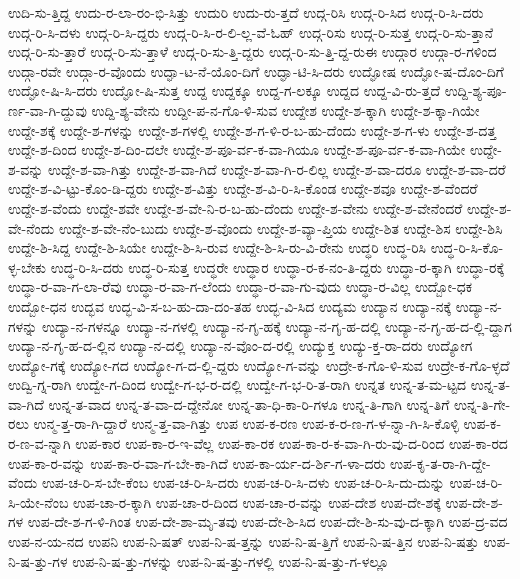 {ಉದಿ-ಸು-ತ್ತಿದ್ದ
ಉದು-ರ-ಲಾ-ರಂ-ಭಿ-ಸಿತ್ತು
ಉದುರಿ
ಉದು-ರು-ತ್ತದೆ
ಉದ್ಗ-ರಿಸಿ
ಉದ್ಗ-ರಿ-ಸಿದ
ಉದ್ಗ-ರಿ-ಸಿ-ದರು
ಉದ್ಗ-ರಿ-ಸಿ-ದಳು
ಉದ್ಗ-ರಿ-ಸಿ-ದ್ದರು
ಉದ್ಗ-ರಿ-ಸಿ-ರ-ಲಿ-ಲ್ಲ-ವೆ-ಓಹ್
ಉದ್ಗ-ರಿಸು
ಉದ್ಗ-ರಿ-ಸುತ್ತ
ಉದ್ಗ-ರಿ-ಸು-ತ್ತಾನೆ
ಉದ್ಗ-ರಿ-ಸು-ತ್ತಾರೆ
ಉದ್ಗ-ರಿ-ಸು-ತ್ತಾಳೆ
ಉದ್ಗ-ರಿ-ಸು-ತ್ತಿ-ದ್ದರು
ಉದ್ಗ-ರಿ-ಸು-ತ್ತಿ-ದ್ದ-ರುಈ
ಉದ್ಗಾರ
ಉದ್ಗಾ-ರ-ಗಳಿಂದ
ಉದ್ಗಾ-ರವೇ
ಉದ್ಗಾ-ರ-ವೊಂದು
ಉದ್ಘಾ-ಟ-ನೆ-ಯೊಂ-ದಿಗೆ
ಉದ್ಘಾ-ಟಿ-ಸಿ-ದರು
ಉದ್ಘೋಷ
ಉದ್ಘೋ-ಷ-ದೊಂ-ದಿಗೆ
ಉದ್ಘೋ-ಷಿ-ಸಿ-ದರು
ಉದ್ಘೋ-ಷಿ-ಸುತ್ತ
ಉದ್ದ
ಉದ್ದಕ್ಕೂ
ಉದ್ದ-ಗ-ಲಕ್ಕೂ
ಉದ್ದದ
ಉದ್ದ-ವಿ-ರು-ತ್ತದೆ
ಉದ್ದಿ-ಶ್ಯ-ಪೂ-ರ್ಣ-ವಾ-ಗಿ-ದ್ದುವು
ಉದ್ದಿ-ಶ್ಯ-ವೇನು
ಉದ್ದೀ-ಪ-ನ-ಗೊ-ಳಿ-ಸುವ
ಉದ್ದೇಶ
ಉದ್ದೇ-ಶ-ಕ್ಕಾಗಿ
ಉದ್ದೇ-ಶ-ಕ್ಕಾ-ಗಿಯೇ
ಉದ್ದೇ-ಶಕ್ಕೆ
ಉದ್ದೇ-ಶ-ಗಳನ್ನು
ಉದ್ದೇ-ಶ-ಗಳಲ್ಲಿ
ಉದ್ದೇ-ಶ-ಗ-ಳಿ-ರ-ಬ-ಹು-ದೆಂದು
ಉದ್ದೇ-ಶ-ಗ-ಳು
ಉದ್ದೇ-ಶ-ದತ್ತ
ಉದ್ದೇ-ಶ-ದಿಂದ
ಉದ್ದೇ-ಶ-ದಿಂ-ದಲೇ
ಉದ್ದೇ-ಶ-ಪೂ-ರ್ವ-ಕ-ವಾ-ಗಿಯೂ
ಉದ್ದೇ-ಶ-ಪೂ-ರ್ವ-ಕ-ವಾ-ಗಿಯೇ
ಉದ್ದೇ-ಶ-ವನ್ನು
ಉದ್ದೇ-ಶ-ವಾ-ಗಿತ್ತು
ಉದ್ದೇ-ಶ-ವಾ-ಗಿದೆ
ಉದ್ದೇ-ಶ-ವಾ-ಗಿ-ರ-ಲಿಲ್ಲ
ಉದ್ದೇ-ಶ-ವಾ-ದರೂ
ಉದ್ದೇ-ಶ-ವಾ-ದರೆ
ಉದ್ದೇ-ಶ-ವಿ-ಟ್ಟು-ಕೊಂ-ಡಿ-ದ್ದರು
ಉದ್ದೇ-ಶ-ವಿತ್ತು
ಉದ್ದೇ-ಶ-ವಿ-ರಿ-ಸಿ-ಕೊಂಡ
ಉದ್ದೇ-ಶವೂ
ಉದ್ದೇ-ಶ-ವೆಂದರೆ
ಉದ್ದೇ-ಶ-ವೆಂದು
ಉದ್ದೇ-ಶವೇ
ಉದ್ದೇ-ಶ-ವೇ-ನಿ-ರ-ಬ-ಹು-ದೆಂದು
ಉದ್ದೇ-ಶ-ವೇನು
ಉದ್ದೇ-ಶ-ವೇನೆಂದರೆ
ಉದ್ದೇ-ಶ-ವೇ-ನೆಂದು
ಉದ್ದೇ-ಶ-ವೇ-ನೆಂ-ಬುದು
ಉದ್ದೇ-ಶ-ವೊಂದು
ಉದ್ದೇ-ಶ-ವ್ಯಾ-ಪ್ತಿಯ
ಉದ್ದೇ-ಶಿತ
ಉದ್ದೇ-ಶಿಸ
ಉದ್ದೇ-ಶಿಸಿ
ಉದ್ದೇ-ಶಿ-ಸಿದ್ದ
ಉದ್ದೇ-ಶಿ-ಸಿಯೇ
ಉದ್ದೇ-ಶಿ-ಸಿ-ರುವ
ಉದ್ದೇ-ಶಿ-ಸಿ-ರು-ವಿ-ರೇನು
ಉದ್ಧರಿ
ಉದ್ಧ-ರಿಸಿ
ಉದ್ಧ-ರಿ-ಸಿ-ಕೊ-ಳ್ಳ-ಬೇಕು
ಉದ್ಧ-ರಿ-ಸಿ-ದರು
ಉದ್ಧ-ರಿ-ಸುತ್ತ
ಉದ್ಧರೇ
ಉದ್ಧಾರ
ಉದ್ಧಾ-ರ-ಕ-ನಂ-ತಿ-ದ್ದರು
ಉದ್ಧಾ-ರ-ಕ್ಕಾಗಿ
ಉದ್ಧಾ-ರಕ್ಕೆ
ಉದ್ಧಾ-ರ-ವಾ-ಗ-ಲಾ-ರೆವು
ಉದ್ಧಾ-ರ-ವಾ-ಗ-ಲೆಂದು
ಉದ್ಧಾ-ರ-ವಾ-ಗು-ವುದು
ಉದ್ಧಾ-ರ-ವಿಲ್ಲ
ಉದ್ಬೋ-ಧಕ
ಉದ್ಬೋ-ಧನ
ಉದ್ಭವ
ಉದ್ಭ-ವಿ-ಸ-ಬ-ಹು-ದಾ-ದಂ-ತಹ
ಉದ್ಭ-ವಿ-ಸಿದ
ಉದ್ಯಮ
ಉದ್ಯಾನ
ಉದ್ಯಾ-ನಕ್ಕೆ
ಉದ್ಯಾ-ನ-ಗಳನ್ನು
ಉದ್ಯಾ-ನ-ಗಳನ್ನೂ
ಉದ್ಯಾ-ನ-ಗಳಲ್ಲಿ
ಉದ್ಯಾ-ನ-ಗೃ-ಹಕ್ಕೆ
ಉದ್ಯಾ-ನ-ಗೃ-ಹ-ದಲ್ಲಿ
ಉದ್ಯಾ-ನ-ಗೃ-ಹ-ದ-ಲ್ಲಿ-ದ್ದಾಗ
ಉದ್ಯಾ-ನ-ಗೃ-ಹ-ದ-ಲ್ಲಿನ
ಉದ್ಯಾ-ನ-ದಲ್ಲಿ
ಉದ್ಯಾ-ನ-ವೊಂ-ದ-ರಲ್ಲಿ
ಉದ್ಯುಕ್ತ
ಉದ್ಯು-ಕ್ತ-ರಾ-ದರು
ಉದ್ಯೋಗ
ಉದ್ಯೋ-ಗಕ್ಕೆ
ಉದ್ಯೋ-ಗದ
ಉದ್ಯೋ-ಗ-ದ-ಲ್ಲಿ-ದ್ದರು
ಉದ್ಯೋ-ಗ-ವನ್ನು
ಉದ್ರೇ-ಕ-ಗೊ-ಳಿ-ಸುವ
ಉದ್ರೇ-ಕ-ಗೊ-ಳ್ಳದೆ
ಉದ್ವಿ-ಗ್ನ-ರಾಗಿ
ಉದ್ವೇ-ಗ-ದಿಂದ
ಉದ್ವೇ-ಗ-ಭ-ರ-ದಲ್ಲಿ
ಉದ್ವೇ-ಗ-ಭ-ರಿ-ತ-ರಾಗಿ
ಉನ್ನತ
ಉನ್ನ-ತ-ಮ-ಟ್ಟದ
ಉನ್ನ-ತ-ವಾ-ಗಿದೆ
ಉನ್ನ-ತ-ವಾದ
ಉನ್ನ-ತ-ವಾ-ದ-ದ್ದೇನೋ
ಉನ್ನ-ತಾ-ಧಿ-ಕಾ-ರಿ-ಗಳೂ
ಉನ್ನ-ತಿ-ಗಾಗಿ
ಉನ್ನ-ತಿಗೆ
ಉನ್ನ-ತಿ-ಗೇ-ರಲು
ಉನ್ಮ-ತ್ತ-ರಾ-ಗಿ-ದ್ದಾರೆ
ಉನ್ಮ-ತ್ತ-ವಾ-ಗಿತ್ತು
ಉಪ
ಉಪ-ಕ-ರಣ
ಉಪ-ಕ-ರ-ಣ-ಗ-ಳ-ನ್ನಾ-ಗಿ-ಸಿ-ಕೊಳ್ಳಿ
ಉಪ-ಕ-ರ-ಣ-ವ-ನ್ನಾಗಿ
ಉಪ-ಕಾರ
ಉಪ-ಕಾ-ರ-ಇ-ವೆಲ್ಲ
ಉಪ-ಕಾ-ರಕ
ಉಪ-ಕಾ-ರ-ಕ-ವಾ-ಗಿ-ರು-ವು-ದ-ರಿಂದ
ಉಪ-ಕಾ-ರದ
ಉಪ-ಕಾ-ರ-ವನ್ನು
ಉಪ-ಕಾ-ರ-ವಾ-ಗ-ಬೇ-ಕಾ-ಗಿದೆ
ಉಪ-ಕಾ-ರ್ಯ-ದ-ರ್ಶಿ-ಗ-ಳಾ-ದರು
ಉಪ-ಕೃ-ತ-ರಾ-ಗಿ-ದ್ದೇ-ವೆಂದು
ಉಪ-ಚ-ರಿ-ಸ-ಬೇ-ಕೆಂಬ
ಉಪ-ಚ-ರಿ-ಸಿ-ದರು
ಉಪ-ಚ-ರಿ-ಸಿ-ದಳು
ಉಪ-ಚ-ರಿ-ಸಿ-ದು-ದುನ್ನು
ಉಪ-ಚ-ರಿ-ಸಿ-ಯೇ-ನೆಂಬ
ಉಪ-ಚಾ-ರ-ಕ್ಕಾಗಿ
ಉಪ-ಚಾ-ರ-ದಿಂದ
ಉಪ-ಚಾ-ರ-ವನ್ನು
ಉಪ-ದೇಶ
ಉಪ-ದೇ-ಶಕ್ಕೆ
ಉಪ-ದೇ-ಶ-ಗಳ
ಉಪ-ದೇ-ಶ-ಗ-ಳಿ-ಗಿಂತ
ಉಪ-ದೇ-ಶಾ-ಮೃ-ತವು
ಉಪ-ದೇ-ಶಿ-ಸಿದ
ಉಪ-ದೇ-ಶಿ-ಸು-ವು-ದ-ಕ್ಕಾಗಿ
ಉಪ-ದ್ರ-ವದ
ಉಪ-ನ-ಯ-ನದ
ಉಪನಿ
ಉಪ-ನಿ-ಷತ್
ಉಪ-ನಿ-ಷ-ತ್ತನ್ನು
ಉಪ-ನಿ-ಷ-ತ್ತಿಗೆ
ಉಪ-ನಿ-ಷ-ತ್ತಿನ
ಉಪ-ನಿ-ಷತ್ತು
ಉಪ-ನಿ-ಷ-ತ್ತು-ಗಳ
ಉಪ-ನಿ-ಷ-ತ್ತು-ಗಳನ್ನು
ಉಪ-ನಿ-ಷ-ತ್ತು-ಗಳಲ್ಲಿ
ಉಪ-ನಿ-ಷ-ತ್ತು-ಗ-ಳಲ್ಲೂ
}
